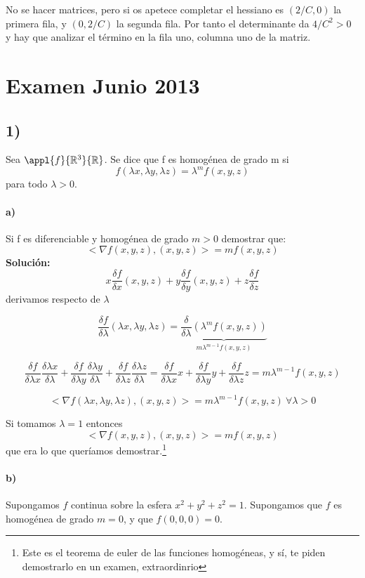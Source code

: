 \documentclass{apuntes}
\begin{document}
No se hacer matrices, pero si os apetece completar el hessiano es $(2/C, 0)$ la primera fila, y $(0, 2/C)$ la segunda fila. Por tanto el determinante da $4/C^2 > 0$ y hay que analizar el término en la fila uno, columna uno de la matriz.

\section{Examen Junio 2013}
\subsection{1)} Sea $\appl{f}{\mathbb{R}^3}{\mathbb{R}}$. Se dice que f es homogénea de grado m si\\
$$f(\lambda x, \lambda y, \lambda z) = \lambda ^m f(x,y,z)$$ para todo $\lambda > 0$.

\paragraph{a)} Si f es diferenciable y homogénea de grado $m>0$ demostrar que:
$$<\nabla f(x,y,z), (x,y,z) > = mf(x,y,z)$$
\textbf{Solución:}\\
$$x\frac{\delta f}{\delta x}(x,y,z) + y\frac{\delta f}{\delta y}(x,y,z) + z\frac{\delta f}{\delta z}$$
derivamos respecto de $\lambda$

$$\frac{\delta f}{\delta \lambda}(\lambda x, \lambda y, \lambda z) = \underbrace{\frac{\delta}{\delta \lambda}(\lambda^mf(x,y,z))}_{m\lambda^{m-1}f(x,y,z)}$$

$$\frac{\delta f}{\delta \lambda x}\frac{\delta \lambda x}{\delta \lambda} + \frac{\delta f}{\delta \lambda y}\frac{\delta \lambda y}{\delta \lambda} + \frac{\delta f}{\delta \lambda z}\frac{\delta \lambda z}{\delta \lambda} = \frac{\delta f}{\delta \lambda x}x + \frac{\delta f}{\delta \lambda y}y + \frac{\delta f}{\delta \lambda z}z = m\lambda ^{m-1} f(x,y,z) $$

$$<\nabla f(\lambda x,\lambda y,\lambda z), (x,y,z) > = m\lambda^{m-1} f(x,y,z)\ \forall \lambda > 0$$

Si tomamos $\lambda = 1$ entonces $$<\nabla f(x,y,z), (x,y,z) > = mf(x,y,z)$$ que era lo que queríamos demostrar.\footnote{Este es el teorema de euler de las funciones homogéneas, y sí, te piden demostrarlo en un examen, extraordinrio}

\paragraph{b)} Supongamos $f$ continua sobre la esfera ${x^2+y^2+z^2=1}$. Supongamos que $f$ es homogénea de grado $m = 0$, y que $f(0,0,0) = 0$.
\end{document}
